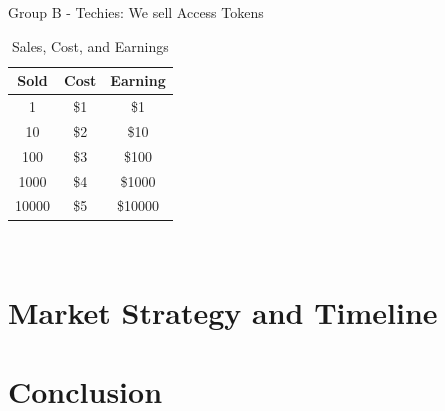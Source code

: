 \documentclass{report}
\begin{document}
\hspace{-1em}Group B - Techies: We sell Access Tokens
\begin{table}[hbp]
	\centering
	\caption{Sales, Cost, and Earnings}
	\label{tab:sales}
	\begin{tabular}{|c|c|c|}
		\hline
		\textbf{Sold} & \textbf{Cost} & \textbf{Earning} \\
		\hline
		1             & \$1           & \$1              \\
		\hline
		10            & \$2           & \$10             \\
		\hline
		100           & \$3           & \$100            \\
		\hline
		1000          & \$4           & \$1000           \\
		\hline
		10000         & \$5           & \$10000          \\
		\hline
	\end{tabular}
\end{table}
\\
\lipsum[1][1-10]

\newpage

\section{Market Strategy and Timeline}
\section{Conclusion}
\end{document}
